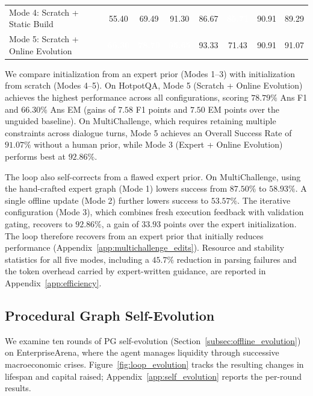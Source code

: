 \begin{table}[thbp]
\begin{tabular}{l c c c c c c c}
Mode 4: Scratch + Static Build     & 55.40 & 69.49 & 91.30 & 86.67 & \cellcolor{GoogleBlue}\textcolor{white}{\textbf{85.71}} & 90.91 & 89.29 \\
Mode 5: Scratch + Online Evolution & \cellcolor{GoogleBlue}\textcolor{white}{\textbf{66.30}} & \cellcolor{GoogleBlue}\textcolor{white}{\textbf{78.79}} & \cellcolor{GoogleBlue}\textcolor{white}{\textbf{95.65}} & 93.33 & 71.43 & 90.91 & 91.07 \\
\bottomrule
\end{tabular}
\end{table}
We compare initialization from an expert prior (Modes 1--3) with initialization from scratch (Modes 4--5). On HotpotQA, Mode 5 (Scratch + Online Evolution) achieves the highest performance across all configurations, scoring $78.79\%$ Ans F1 and $66.30\%$ Ans EM (gains of $7.58$ F1 points and $7.50$ EM points over the unguided baseline). On MultiChallenge, which requires retaining multiple constraints across dialogue turns, Mode 5 achieves an Overall Success Rate of $91.07\%$ without a human prior, while Mode 3 (Expert + Online Evolution) performs best at $92.86\%$.

The loop also self-corrects from a flawed expert prior. On MultiChallenge, using the hand-crafted expert graph (Mode 1) lowers success from $87.50\%$ to $58.93\%$. A single offline update (Mode 2) further lowers success to $53.57\%$. The iterative configuration (Mode 3), which combines fresh execution feedback with validation gating, recovers to $92.86\%$, a gain of $33.93$ points over the expert initialization. The loop therefore recovers from an expert prior that initially reduces performance (Appendix~\ref{app:multichallenge_edits}). Resource and stability statistics for all five modes, including a $45.7\%$ reduction in parsing failures and the token overhead carried by expert-written guidance, are reported in Appendix~\ref{app:efficiency}.

\subsection{Procedural Graph Self-Evolution}
\label{subsec:evolution_results}

We examine ten rounds of PG self-evolution (Section~\ref{subsec:offline_evolution}) on EnterpriseArena, where the agent manages liquidity through successive macroeconomic crises. Figure~\ref{fig:loop_evolution} tracks the resulting changes in lifespan and capital raised; Appendix~\ref{app:self_evolution} reports the per-round results.


